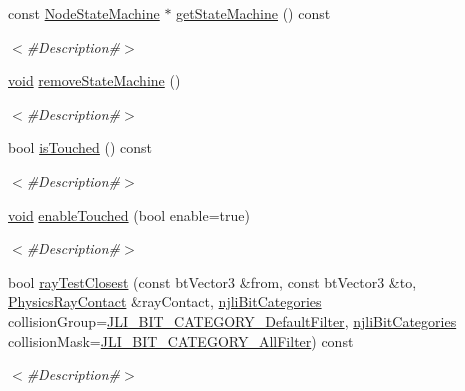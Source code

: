 \begin{DoxyCompactItemize}
const \mbox{\hyperlink{classnjli_1_1_node_state_machine}{Node\+State\+Machine}} $\ast$ \mbox{\hyperlink{classnjli_1_1_node_ae42a983ef4f2f4037aa94bc9a5b8a59b}{get\+State\+Machine}} () const
\begin{DoxyCompactList}\small\item\em $<$\#\+Description\#$>$ \end{DoxyCompactList}\item 
\mbox{\hyperlink{_thread_8h_af1e856da2e658414cb2456cb6f7ebc66}{void}} \mbox{\hyperlink{classnjli_1_1_node_ab3c28554c6727257099723089739f1c1}{remove\+State\+Machine}} ()
\begin{DoxyCompactList}\small\item\em $<$\#\+Description\#$>$ \end{DoxyCompactList}\item 
bool \mbox{\hyperlink{classnjli_1_1_node_a67b6e23d47cf7be1b80f2c137a66081c}{is\+Touched}} () const
\begin{DoxyCompactList}\small\item\em $<$\#\+Description\#$>$ \end{DoxyCompactList}\item 
\mbox{\hyperlink{_thread_8h_af1e856da2e658414cb2456cb6f7ebc66}{void}} \mbox{\hyperlink{classnjli_1_1_node_a3a62a2eed74823ed7e420beaa16f8c6f}{enable\+Touched}} (bool enable=true)
\begin{DoxyCompactList}\small\item\em $<$\#\+Description\#$>$ \end{DoxyCompactList}\item 
bool \mbox{\hyperlink{classnjli_1_1_node_a1665e8075c188baf897682470cd84103}{ray\+Test\+Closest}} (const bt\+Vector3 \&from, const bt\+Vector3 \&to, \mbox{\hyperlink{classnjli_1_1_physics_ray_contact}{Physics\+Ray\+Contact}} \&ray\+Contact, \mbox{\hyperlink{namespacenjli_af7b302a2b48bb644f85c88080925c974}{njli\+Bit\+Categories}} collision\+Group=\mbox{\hyperlink{namespacenjli_af7b302a2b48bb644f85c88080925c974a53b33337014e199f56e752574f36981e}{J\+L\+I\+\_\+\+B\+I\+T\+\_\+\+C\+A\+T\+E\+G\+O\+R\+Y\+\_\+\+Default\+Filter}}, \mbox{\hyperlink{namespacenjli_af7b302a2b48bb644f85c88080925c974}{njli\+Bit\+Categories}} collision\+Mask=\mbox{\hyperlink{namespacenjli_af7b302a2b48bb644f85c88080925c974a0fba80cad161dda96de5cbda9091cdce}{J\+L\+I\+\_\+\+B\+I\+T\+\_\+\+C\+A\+T\+E\+G\+O\+R\+Y\+\_\+\+All\+Filter}}) const
\begin{DoxyCompactList}\small\item\em $<$\#\+Description\#$>$ \end{DoxyCompactList}\item 

\end{DoxyCompactItemize}
